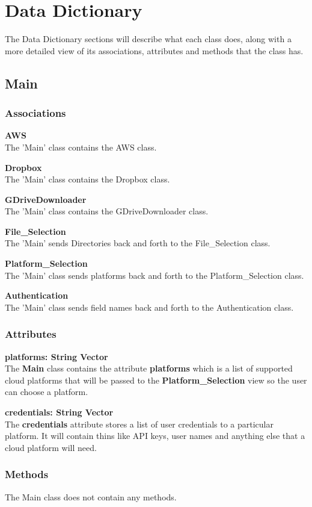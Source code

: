 \section{Data Dictionary}
The Data Dictionary sections will describe what each class does, along with a more detailed view of its
associations, attributes and methods that the class has.

\subsection{Main}

\subsubsection{Associations}
\textbf{AWS} \\
The 'Main' class contains the AWS class.

\textbf{Dropbox} \\
The 'Main' class contains the Dropbox class.

\textbf{GDriveDownloader} \\
The 'Main' class contains the GDriveDownloader class.

\textbf{File\_Selection} \\
The 'Main' sends Directories back and forth to the File\_Selection class.

\textbf{Platform\_Selection} \\
The 'Main' class sends platforms back and forth to the Platform\_Selection class.

\textbf{Authentication} \\
The 'Main' class sends field names back and forth to the Authentication class.

\subsubsection{Attributes}
\textbf{platforms: String Vector} \\
The \textbf{Main} class contains the attribute \textbf{platforms} which is a list of
supported cloud platforms that will be passed to the \textbf{Platform\_Selection} view
so the user can choose a platform.

\textbf{credentials: String Vector} \\
The \textbf{credentials} attribute stores a list of user credentials to a particular
platform. It will contain thins like API keys, user names and anything else that a
cloud platform will need.

\subsubsection{Methods}
The Main class does not contain any methods.

